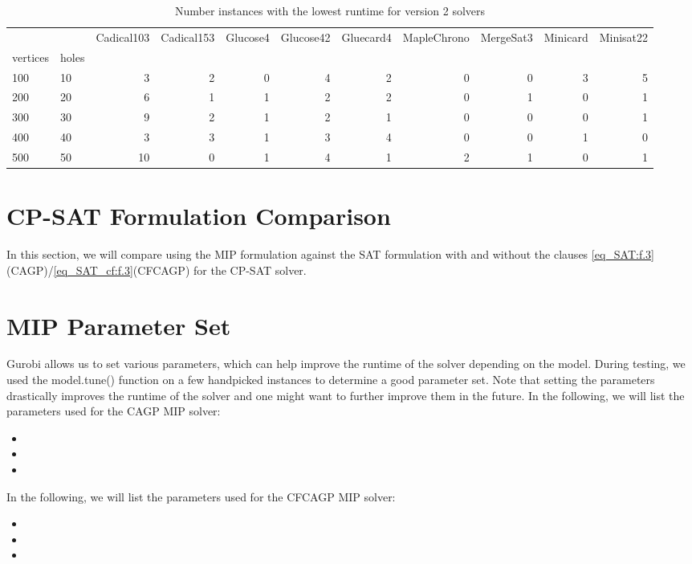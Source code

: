 \begin{table}[]
\centering
\begin{tabular}{llrrrrrrrrr}
\toprule
 & & Cadical103 & Cadical153 & Glucose4 & Glucose42 & Gluecard4 & MapleChrono & MergeSat3 & Minicard & Minisat22 \\
vertices & holes &  &  &  &  &  &  &  &  &  \\
\midrule
100 & 10 & 3 & 2 & 0 & 4 & 2 & 0 & 0 & 3 & 5 \\
\cline{1-11}
200 & 20 & 6 & 1 & 1 & 2 & 2 & 0 & 1 & 0 & 1 \\
\cline{1-11}
300 & 30 & 9 & 2 & 1 & 2 & 1 & 0 & 0 & 0 & 1 \\
\cline{1-11}
400 & 40 & 3 & 3 & 1 & 3 & 4 & 0 & 0 & 1 & 0 \\
\cline{1-11}
500 & 50 & 10 & 0 & 1 & 4 & 1 & 2 & 1 & 0 & 1 \\
\cline{1-11}
\bottomrule
\end{tabular}
\caption{Number instances with the lowest runtime for version 2 solvers}
\label{tab:SAT_small_time_v2}
\end{table}

\section{CP-SAT Formulation Comparison}
In this section, we will compare using the MIP formulation against the SAT formulation with and without the clauses \cref{eq_SAT:f.3}(CAGP)/\cref{eq_SAT_cf:f.3}(CFCAGP) for the CP-SAT solver. 

\section{MIP Parameter Set}
Gurobi allows us to set various parameters, which can help improve the runtime of the solver depending on the model. During testing, we used the model.tune() function on a few handpicked instances to determine a good parameter set. Note that setting the parameters drastically improves the runtime of the solver and one might want to further improve them in the future. In the following, we will list the parameters used for the CAGP MIP solver:
\begin{itemize}
  \item 
  \item 
  \item 
\end{itemize}
In the following, we will list the parameters used for the CFCAGP MIP solver:
\begin{itemize}
  \item 
  \item 
  \item 
\end{itemize}

